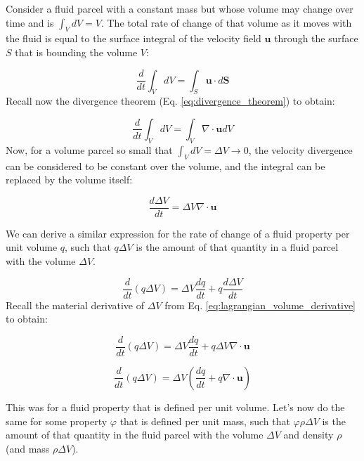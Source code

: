 \documentclass[12pt]{article}
\numberwithin{equation}{section}
\numberwithin{figure}{section}
\numberwithin{table}{section}
\begin{document}
Consider a fluid parcel with a constant mass but whose volume may change over
time and is $\int_V dV = V$.
The total rate of change of that volume as it moves with the fluid is equal to
the surface integral of the velocity field $\mathbf{u}$ through the surface
$S$ that is bounding the volume $V$:

\begin{equation}
  \frac{d}{dt}\int_V dV = \int_S \mathbf{u} \cdot d\mathbf{S}
\end{equation}
Recall now the divergence theorem (Eq. \ref{eq:divergence_theorem}) to obtain:

\begin{equation}
  \frac{d}{dt}\int_V dV = \int_V \nabla \cdot \mathbf{u} dV
\end{equation}
Now, for a volume parcel so small that $\int_V dV = \Delta V \to 0$, the
velocity divergence can be considered to be constant over the volume, and the
integral can be replaced by the volume itself:

\begin{equation}
  \frac{d\Delta V}{dt} = \Delta V \nabla \cdot \mathbf{u}
  \label{eq:lagrangian_volume_derivative}
\end{equation}

We can derive a similar expression for the rate of change of a fluid property
per unit volume $q$, such that $q \Delta V$ is the amount of that quantity in
a fluid parcel with the volume $\Delta V$.

\begin{equation}
  \frac{d}{dt} (q \Delta V) = \Delta V \frac{dq}{dt} + q \frac{d\Delta V}{dt}
\end{equation}
Recall the material derivative of $\Delta V$ from Eq. \ref{eq:lagrangian_volume_derivative}
to obtain:

\begin{equation}
  \frac{d}{dt} (q \Delta V) = \Delta V \frac{dq}{dt} + q \Delta V \nabla \cdot \mathbf{u}
\end{equation}

\begin{equation}
  \frac{d}{dt} (q \Delta V) = \Delta V \left( \frac{dq}{dt} + q \nabla \cdot \mathbf{u} \right)
  \label{eq:lagrangian_property_derivative}
\end{equation}

This was for a fluid property that is defined per unit volume.
Let's now do the same for some property $\varphi$ that is defined per unit mass,
such that $\varphi \rho \Delta V$ is the amount of that quantity in the fluid
parcel with the volume $\Delta V$ and density $\rho$ (and mass $\rho \Delta V$).
\end{document}

